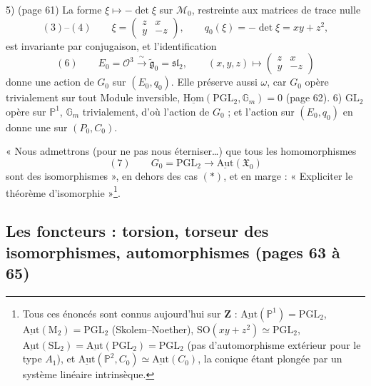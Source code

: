 \documentclass[11pt,a4paper]{article}
\begin{document}
5) (page 61) La forme $\xi \mapsto -\det\xi$ sur $\mathcal{M}_0$, restreinte aux matrices
de trace nulle
\[
  (3)\text{--}(4) \qquad \xi = \begin{pmatrix} z & x \\ y & -z \end{pmatrix}, \qquad
  q_0(\xi) = -\det\xi = xy + z^2 ,
\]
est invariante par conjugaison, et l'identification
\[
  (6) \qquad E_0 = \mathcal{O}^3 \xrightarrow{\ \sim\ } \widetilde{\mathfrak{g}}_0 = \mathfrak{sl}_2 , \qquad
  (x, y, z) \longmapsto \begin{pmatrix} z & x \\ y & -z \end{pmatrix}
\]
donne une action de $G_0$ sur $(E_0, q_0)$. Elle préserve aussi $\omega$, car $G_0$
opère trivialement sur tout Module inversible, $\underline{\mathrm{Hom}}(\mathrm{PGL}_2,
\mathbb{G}_m) = 0$ (page 62). 6) $\mathrm{GL}_2$ opère sur $\mathbb{P}^1$, $\mathbb{G}_m$
trivialement, d'où l'action de $G_0$ ; et l'action sur $(E_0, q_0)$ en donne une
sur $(P_0, C_0)$.

« Nous admettrons (pour ne pas nous éterniser…) que tous les homomorphismes
\[
  (7) \qquad G_0 = \mathrm{PGL}_2 \longrightarrow \underline{\mathrm{Aut}}(\mathfrak{X}_0)
\]
sont des isomorphismes », en dehors des cas $(*)$, et en marge : « Expliciter le
théorème d'isomorphie »\footnote{Tous ces énoncés sont connus aujourd'hui sur
$\mathbf{Z}$ : $\underline{\mathrm{Aut}}(\mathbb{P}^1) = \mathrm{PGL}_2$,
$\underline{\mathrm{Aut}}(\mathrm{M}_2) = \mathrm{PGL}_2$ (Skolem--Noether), $\mathrm{SO}(xy + z^2)
\simeq \mathrm{PGL}_2$, $\underline{\mathrm{Aut}}(\mathrm{SL}_2) = \underline{\mathrm{Aut}}(\mathrm{PGL}_2) =
\mathrm{PGL}_2$ (pas d'automorphisme extérieur pour le type $A_1$), et
$\underline{\mathrm{Aut}}(\mathbb{P}^2, C_0) \simeq \underline{\mathrm{Aut}}(C_0)$, la conique étant
plongée par un système linéaire intrinsèque.}.

\subsection*{Les foncteurs : torsion, torseur des isomorphismes, automorphismes (pages 63 à 65)}
\end{document}
